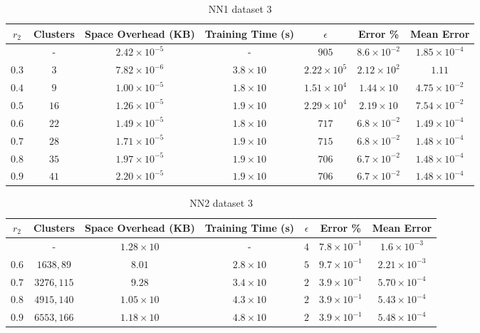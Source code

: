 \begin{adjustwidth}{-1cm}{}
\begin{table}
\caption{NN1 dataset 3}\label{ws110}
\begin{tabular}{ccccccc}
\hline
\toprule
$r_2$ & Clusters & Space Overhead (KB) & Training Time (s) & $\epsilon$ & Error \% & Mean Error\\
\midrule
& - & $2.42 \times 10^{-5}$ & - & $905$ & $8.6 \times 10^{-2}$ & $1.85 \times 10^{-4}$\\
$0.3$ & $3$ & $7.82 \times 10^{-6}$ & $3.8 \times 10$ & $2.22 \times 10^5$ & $2.12 \times 10^2$ & $1.11$\\
$0.4$ & $9$ & $1.00 \times 10^{-5}$ & $1.8 \times 10$ & $1.51 \times 10^4$ & $1.44 \times 10$ & $4.75 \times 10^{-2}$\\
$0.5$ & $16$ & $1.26 \times 10^{-5}$ & $1.9 \times 10$ & $2.29 \times 10^4$ & $2.19 \times 10$ & $7.54 \times 10^{-2}$\\
$0.6$ & $22$ & $1.49 \times 10^{-5}$ & $1.8 \times 10$ & $717$ & $6.8 \times 10^{-2}$ & $1.49 \times 10^{-4}$\\
$0.7$ & $28$ & $1.71 \times 10^{-5}$ & $1.9 \times 10$ & $715$ & $6.8 \times 10^{-2}$ & $1.48 \times 10^{-4}$\\
$0.8$ & $35$ & $1.97 \times 10^{-5}$ & $1.9 \times 10$ & $706$ & $6.7 \times 10^{-2}$ & $1.48 \times 10^{-4}$\\
$0.9$ & $41$ & $2.20 \times 10^{-5}$ & $1.9 \times 10$ & $706$ & $6.7 \times 10^{-2}$ & $1.48 \times 10^{-4}$\\
\bottomrule
\end{tabular}
\end{table}
\end{adjustwidth}

\begin{adjustwidth}{-1cm}{}
\begin{table}
\caption{NN2 dataset 3}\label{ws23}
\begin{tabular}{ccccccc}
\hline
\toprule
$r_2$ & Clusters & Space Overhead (KB) & Training Time (s) & $\epsilon$ & Error \% & Mean Error\\
\midrule
& - & $1.28 \times 10$ & - & $4$ & $7.8 \times 10^{-1}$ & $1.6 \times 10^{-3}$\\
$0.6$ & $1638, 89$ & $8.01$ & $2.8 \times 10$ & $5$ & $9.7 \times 10^{-1}$ & $2.21 \times 10^{-3}$\\
$0.7$ & $3276, 115$ & $9.28$ & $3.4 \times 10$ & $2$ & $3.9 \times 10^{-1}$ & $5.70 \times 10^{-4}$\\
$0.8$ & $4915, 140$ & $1.05 \times 10$ & $4.3 \times 10$ & $2$ & $3.9 \times 10^{-1}$ & $5.43 \times 10^{-4}$\\
$0.9$ & $6553, 166$ & $1.18 \times 10$ & $4.8 \times 10$ & $2$ & $3.9 \times 10^{-1}$ & $5.48 \times 10^{-4}$\\
\bottomrule
\end{tabular}
\end{table}
\end{adjustwidth}

